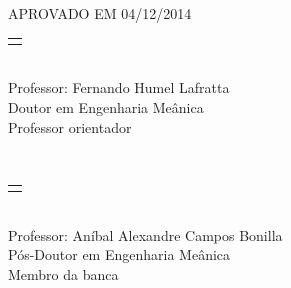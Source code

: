 \documentclass[12pt]{article}
\begin{document}
\onehalfspacing


\begin{center}
{
	{
		APROVADO EM 04/12/2014
	}\\[5cm]
	
	{	
		\begin{tabular}[t]{@{}l@{}}
			\makebox[8cm]{\dotfill}\\
		\end{tabular} \\
		Professor: Fernando Humel Lafratta \\
		Doutor em Engenharia Meânica \\
		Professor orientador
	}\\[5cm]
	
	\begin{tabular}[t]{@{}l@{}}
		\makebox[8cm]{\dotfill}\\
	\end{tabular} \\
	Professor: Aníbal Alexandre Campos Bonilla \\
	Pós-Doutor em Engenharia Meânica \\
	Membro da banca \\
}
\end{center}
\pagebreak







\tableofcontents
\pagebreak

\listoffigures
\pagebreak
\end{document}
